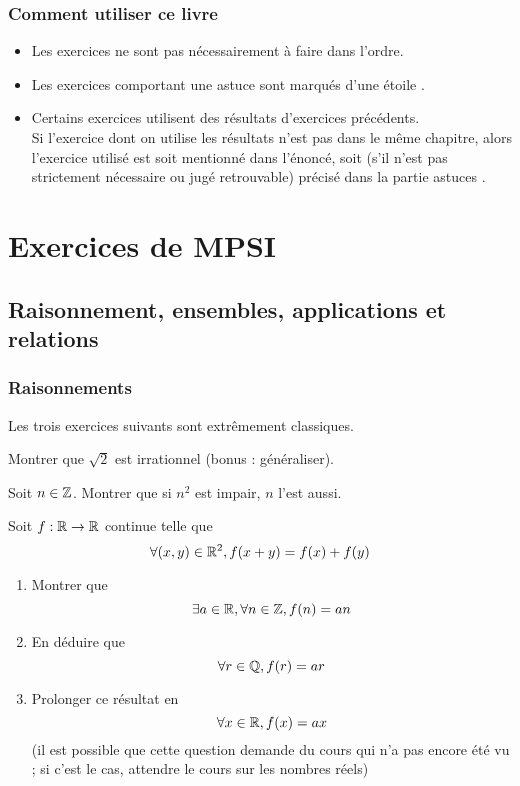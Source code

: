 \documentclass[12pt,a4paper]{exo_book}
\begin{document}
\section*{Comment utiliser ce livre}

\begin{itemize}
    \item Les exercices ne sont pas nécessairement à faire dans l'ordre.
    \item Les exercices comportant une astuce sont marqués d'une étoile \astuce.
    \item Certains exercices utilisent des résultats d'exercices précédents.\\
    Si l'exercice dont on utilise les résultats n'est pas dans le même chapitre, alors l'exercice utilisé est soit mentionné dans l'énoncé, soit (s'il n'est pas strictement nécessaire ou jugé retrouvable) précisé dans la partie \og astuces \fg.
\end{itemize}

\tableofcontents

\part{Exercices de MPSI}

\chapter{Raisonnement, ensembles, applications et relations}

\section{Raisonnements}

Les trois exercices suivants sont extrêmement classiques.

\begin{exo}
    Montrer que $\sqrt{2}$ est irrationnel (bonus : généraliser).
\end{exo}

\begin{exo}
    Soit $n \in \mathbb{Z}$. Montrer que si $n^2$ est impair, $n$ l'est aussi.
\end{exo}

\begin{exo}
    Soit $f : \mathbb{R} \to \mathbb{R}$ continue telle que
    \[\forall (x,y)\in \mathbb{R} ^2, f(x + y) = f(x) + f(y)\]
    \begin{enumerate}
        \item Montrer que
        \[\exists a \in \mathbb{R}, \forall n \in \mathbb{Z}, f(n) = an \]
        \item En déduire que
        \[\forall r \in \mathbb{Q}, f(r) = ar\]
        \item Prolonger ce résultat en
        \[\forall x \in \mathbb{R}, f(x) = ax\]
        (il est possible que cette question demande du cours qui n'a pas encore été vu ; si c'est le cas, attendre le cours sur les nombres réels)
    \end{enumerate}
\end{exo}
\end{document}
